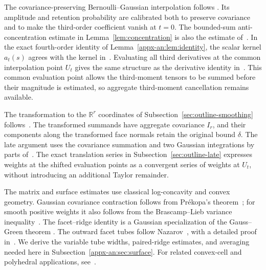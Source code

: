 \documentclass[11pt,letterpaper]{article}
\theoremstyle{remark}
\newcommand{\R}{\mathbb R}
\begin{document}
The covariance-preserving Bernoulli--Gaussian interpolation follows
\cite[Section~4]{AL}. Its amplitude and retention probability are
calibrated both to preserve covariance and to make the third-order
coefficient vanish at \(t=0\). The bounded-sum anti-concentration
estimate in Lemma~\ref{lem:concentration} is also the estimate
of~\cite[Lemma~2.1]{AL}. In the exact fourth-order identity of
Lemma~\ref{appx-an:lem:identity}, the scalar kernel \(a_t(s)\)
agrees with the kernel in~\cite[Lemma~4.1]{AL}. Evaluating all
third derivatives at the common interpolation point \(U_t\) gives
the same structure as the derivative identity
in~\cite[Lemma~22]{GaoZhang}. This common evaluation point allows
the third-moment tensors to be summed before their magnitude is
estimated, so aggregate third-moment cancellation remains available.

The transformation to the \(\R^r\) coordinates of
Subsection~\ref{sec:outline-smoothing} follows~\cite[Section~2.3]{GaoZhang}.
The transformed summands have aggregate covariance \(I_r\),
and their components along the transformed face normals retain the
original bound \(\delta\). The late argument uses the covariance
summation and two Gaussian integrations by parts
of~\cite[Lemma~23]{GaoZhang}. The exact translation series in
Subsection~\ref{sec:outline-late} expresses weights at the shifted
evaluation points as a convergent series of weights at \(U_t\),
without introducing an additional Taylor remainder.

The matrix and surface estimates use classical log-concavity and
convex geometry. Gaussian covariance contraction follows from
Pr\'ekopa's theorem~\cite[Theorem~6]{Prekopa1973}; for smooth positive
weights it also follows from the Brascamp--Lieb variance
inequality~\cite{BrascampLieb1976}. The facet--ridge identity is a
Gaussian specialization of the Gauss--Green theorem
\cite[Chapter~5]{EvansGariepy2015}. The outward facet tubes follow
Nazarov~\cite{Nazarov2003}, with a detailed proof
in~\cite[Lemmas~1--2]{CCK17N}. We derive the variable tube widths,
paired-ridge estimates, and averaging needed here in
Subsection~\ref{appx-an:sec:surface}. For related convex-cell and
polyhedral applications, see~\cite[Lemma~12 and Proposition~4]{GaoZhang}.
\end{document}
